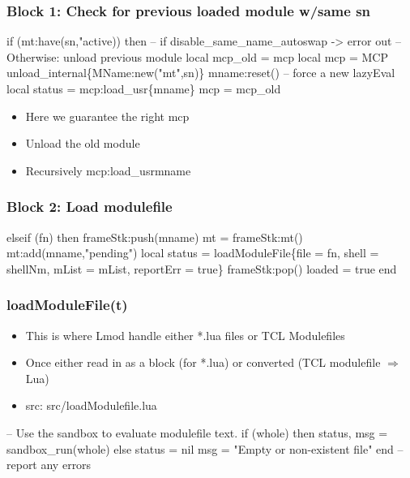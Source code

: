 \documentclass{beamer}
\begin{document}
\begin{frame}[fragile]
\begin{frame}[fragile]
    \frametitle{Block 1: Check for previous loaded module w/same sn}
 {\tiny
    \begin{semiverbatim}
 if (mt:have(sn,"active)) then
    -- if disable_same_name_autoswap -> error out
    -- Otherwise: unload previous module
     local mcp_old = mcp
     local mcp     = MCP
     unload_internal\{MName:new("mt",sn)\}
     mname:reset()  -- force a new lazyEval
     local status = mcp:load_usr\{mname\}
     mcp          = mcp_old
    \end{semiverbatim}
}
  \begin{itemize}
    \item Here we guarantee the right mcp
    \item Unload the old module 
    \item Recursively mcp:load\_usr{mname} 
  \end{itemize}
\end{frame}

\begin{frame}[fragile]
    \frametitle{Block 2: Load modulefile}
 {\tiny
    \begin{semiverbatim}
elseif (fn) then
   frameStk:push(mname)
   mt = frameStk:mt()
   mt:add(mname,"pending")
   local status = loadModuleFile\{file = fn, shell = shellNm,
                   mList = mList, reportErr = true\}
   frameStk:pop()
   loaded = true
end
    \end{semiverbatim}
}
\end{frame}

\begin{frame}[fragile]
    \frametitle{loadModuleFile(t)}
  \begin{itemize}
    \item This is where Lmod handle either *.lua files or TCL Modulefiles
    \item Once either read in as a block (for *.lua) or converted (TCL
      modulefile $\Rightarrow$ Lua)
    \item src: src/loadModulefile.lua
  \end{itemize}
 {\tiny
    \begin{semiverbatim}
   -- Use the sandbox to evaluate modulefile text.
   if (whole) then
      status, msg = sandbox_run(whole)
   else
      status = nil
      msg    = "Empty or non-existent file"
   end
   -- report any errors
    \end{semiverbatim}
}

\end{frame}


\end{frame}
\end{document}
